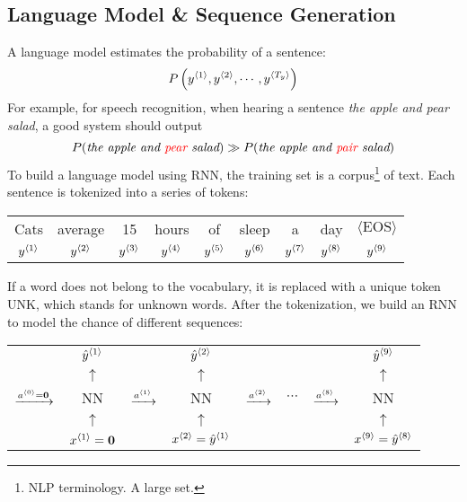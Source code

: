 \subsection{Language Model \& Sequence Generation}
A language model estimates the probability of a sentence:
\[P\left(y^{\left\langle 1\right\rangle},y^{\left\langle 2\right\rangle},\cdots, y^{\left\langle T_y\right\rangle}\right)\]
For example, for speech recognition, when hearing a sentence \textit{the apple and pear salad}, a good system should output 
\[P(\textit{the apple and {\color{red}pear} salad})\gg P(\textit{the apple and {\color{red}pair} salad})\]
To build a language model using RNN, the training set is a corpus\footnote{NLP terminology. A large set.} of text. Each sentence is tokenized into a series of tokens:
\begin{center}
  \begin{tabular}{ccccccccc}
    Cats & average & 15 & hours & of & sleep & a & day & $\langle\text{EOS}\rangle$\footnotemark\\
    $y^{\left\langle 1\right\rangle}$ & $y^{\left\langle 2\right\rangle}$ & $y^{\left\langle 3\right\rangle}$ & $y^{\left\langle 4\right\rangle}$ & $y^{\left\langle 5\right\rangle}$ & $y^{\left\langle 6\right\rangle}$ & $y^{\left\langle 7\right\rangle}$ & $y^{\left\langle 8\right\rangle}$ &  $y^{\left\langle 9\right\rangle}$\\
  \end{tabular}
\end{center}
If a word does not belong to the vocabulary, it is replaced with a unique token UNK, which stands for unknown words. After the tokenization, we build an RNN to model the chance of different sequences:
\begin{center}
  \begin{tabular}{cccccccc}
    & $\hat{y}^{\left\langle 1\right\rangle}$ & & $\hat{y}^{\left\langle 2\right\rangle}$ & & & & $\hat{y}^{\left\langle 9\right\rangle}$\\
    & $\uparrow$ & & $\uparrow$ & & & & $\uparrow$\\ 
    $\xrightarrow{a^{\left\langle 0\right\rangle}=\mathbf{0}}$& NN & $\xrightarrow{a^{\left\langle 1\right\rangle}}$ & NN & $\xrightarrow{a^{\left\langle 2\right\rangle}}$ & $\cdots$ & $\xrightarrow{a^{\left\langle 8\right\rangle}}$ & NN \\ 
    & $\uparrow$ & & $\uparrow$ & & & & $\uparrow$\\ 
    & $x^{\left\langle 1\right\rangle}=\mathbf{0}$ & & $x^{\left\langle 2\right\rangle}=\hat{y}^{\left\langle 1\right\rangle}$ & & & & $x^{\left\langle 9\right\rangle}=\hat{y}^{\left\langle 8\right\rangle}$\\
  \end{tabular}
\end{center}
